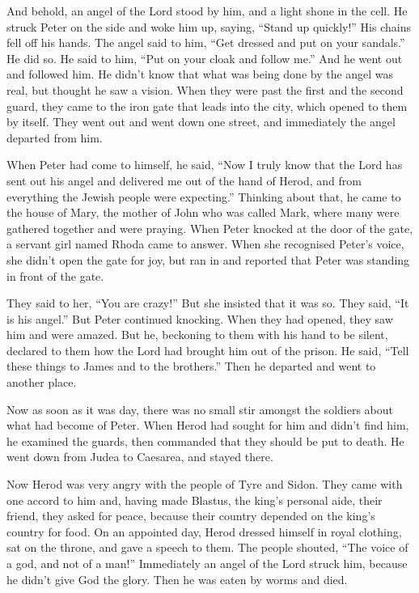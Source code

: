  And behold, an angel of the Lord stood by him, and a light
shone in the cell. He struck Peter on the side and woke him up, saying,
``Stand up quickly!'' His chains fell off his hands.  The
angel said to him, ``Get dressed and put on your sandals.'' He did so.
He said to him, ``Put on your cloak and follow me.''  And he
went out and followed him. He didn't know that what was being done by
the angel was real, but thought he saw a vision.  When they
were past the first and the second guard, they came to the iron gate
that leads into the city, which opened to them by itself. They went out
and went down one street, and immediately the angel departed from him.

 When Peter had come to himself, he said, ``Now I truly
know that the Lord has sent out his angel and delivered me out of the
hand of Herod, and from everything the Jewish people were expecting.''
 Thinking about that, he came to the house of Mary, the
mother of John who was called Mark, where many were gathered together
and were praying.  When Peter knocked at the door of the
gate, a servant girl named Rhoda came to answer.  When she
recognised Peter's voice, she didn't open the gate for joy, but ran in
and reported that Peter was standing in front of the gate.

 They said to her, ``You are crazy!'' But she insisted that
it was so. They said, ``It is his angel.''  But Peter
continued knocking. When they had opened, they saw him and were amazed.
 But he, beckoning to them with his hand to be silent,
declared to them how the Lord had brought him out of the prison. He
said, ``Tell these things to James and to the brothers.'' Then he
departed and went to another place.

 Now as soon as it was day, there was no small stir amongst
the soldiers about what had become of Peter.  When Herod
had sought for him and didn't find him, he examined the guards, then
commanded that they should be put to death. He went down from Judea to
Caesarea, and stayed there.

 Now Herod was very angry with the people of Tyre and
Sidon. They came with one accord to him and, having made Blastus, the
king's personal aide, their friend, they asked for peace, because their
country depended on the king's country for food.  On an
appointed day, Herod dressed himself in royal clothing, sat on the
throne, and gave a speech to them.  The people shouted,
``The voice of a god, and not of a man!''  Immediately an
angel of the Lord struck him, because he didn't give God the glory. Then
he was eaten by worms and died.

